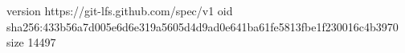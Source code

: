 version https://git-lfs.github.com/spec/v1
oid sha256:433b56a7d005e6d6e319a5605d4d9ad0e641ba61fe5813fbe1f230016c4b3970
size 14497
